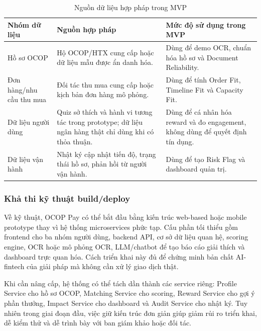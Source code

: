 \documentclass[13pt,a4paper]{extarticle}
\begin{document}
\begin{table}[H]
\centering
\caption{Nguồn dữ liệu hợp pháp trong MVP}
\begin{tabular}{|p{3cm}|p{5cm}|p{5cm}|}
\hline
\textbf{Nhóm dữ liệu} & \textbf{Nguồn hợp pháp} & \textbf{Mức độ sử dụng trong MVP} \\
\hline
Hồ sơ OCOP & Hộ OCOP/HTX cung cấp hoặc dữ liệu mẫu được ẩn danh hóa. & Dùng để demo OCR, chuẩn hóa hồ sơ và Document Reliability. \\
\hline
Đơn hàng/nhu cầu thu mua & Đối tác thu mua cung cấp hoặc kịch bản đơn hàng mô phỏng. & Dùng để tính Order Fit, Timeline Fit và Capacity Fit. \\
\hline
Dữ liệu người dùng & Quiz sở thích và hành vi tương tác trong prototype; dữ liệu ngân hàng thật chỉ dùng khi có thỏa thuận. & Dùng để cá nhân hóa reward và đo engagement, không dùng để quyết định tín dụng. \\
\hline
Dữ liệu vận hành & Nhật ký cập nhật tiến độ, trạng thái hồ sơ, phản hồi từ người vận hành. & Dùng để tạo Risk Flag và dashboard quản trị. \\
\hline
\end{tabular}
\end{table}

\subsubsection{Khả thi kỹ thuật build/deploy}

Về kỹ thuật, OCOP Pay có thể bắt đầu bằng kiến trúc web-based hoặc mobile prototype thay vì hệ thống microservices phức tạp. Cấu phần tối thiểu gồm frontend cho ba nhóm người dùng, backend API, cơ sở dữ liệu quan hệ, scoring engine, OCR hoặc mô phỏng OCR, LLM/chatbot để tạo báo cáo giải thích và dashboard trực quan hóa. Cách triển khai này đủ để chứng minh bản chất AI-fintech của giải pháp mà không cần xử lý giao dịch thật.

Khi cần nâng cấp, hệ thống có thể tách dần thành các service riêng: Profile Service cho hồ sơ OCOP, Matching Service cho scoring, Reward Service cho gợi ý phần thưởng, Impact Service cho dashboard và Audit Service cho nhật ký. Tuy nhiên trong giai đoạn đầu, việc giữ kiến trúc đơn giản giúp giảm rủi ro triển khai, dễ kiểm thử và dễ trình bày với ban giám khảo hoặc đối tác.
\end{document}
